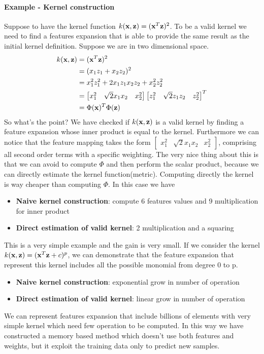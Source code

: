 \documentclass[main.tex]{subfiles}
\begin{document}
\paragraph{Example - Kernel construction}Suppose to have the kernel function $k(\textbf{x}, \textbf{z}) = (\textbf{x}^T \textbf{z})^2$.
To be a valid kernel we need to find a features expansion that is able to provide the same result as the initial kernel definition. Suppose we are in two dimensional space.
\begin{align*}
    k(\textbf{x},\textbf{z}) &= (\textbf{x}^T \textbf{z})^2 \\
    &= (x_1z_1 + x_2z_2)^2 \\
    &= x_1^2z_1^2 + 2x_1z_1x_2z_2 + x_2^2z_2^2 \\
    &= \begin{bmatrix} x_1^2 & \sqrt{2}x_1x_2 & x_2^2\end{bmatrix}\begin{bmatrix} z_1^2 & \sqrt{2}z_1z_2 & z_2^2\end{bmatrix}^T \\
    &= \Phi(\textbf{x})^T \Phi(\textbf{z})
\end{align*}
So what's the point? We have checked if $k(\textbf{x},\textbf{z})$ is a valid kernel by finding a feature expansion whose inner product is equal to the kernel. Furthermore we can notice that the feature mapping takes the form $\begin{bmatrix} x_1^2 & \sqrt{2}x_1x_2 & x_2^2\end{bmatrix}$, comprising all second order terms with a specific weighting. The very nice thing about this is that we can avoid to compute $\Phi$ and then perform the scalar product, because we can directly estimate the kernel function(metric). Computing directly the kernel is way cheaper than computing $\Phi$.
In this case we have
\begin{itemize}
    \item \textbf{Naive kernel construction}: compute 6 features values and 9 multiplication for inner product
    \item \textbf{Direct estimation of valid kernel}: 2 multiplication and a squaring
\end{itemize}
This is a very simple example and the gain is very small. If we consider the kernel $k(\textbf{x},\textbf{z}) = (\textbf{x}^T \textbf{z} + c)^p$, we can demonstrate that the feature expansion that represent this kernel includes all the possible monomial from degree 0 to p.
\begin{itemize}
    \item \textbf{Naive kernel construction}: exponential grow in number of operation
    \item \textbf{Direct estimation of valid kernel}: linear grow in number of operation
\end{itemize}
We can represent features expansion that include billions of elements with very simple kernel which need few operation to be computed.
In this way we have constructed a memory based method which doesn't use both features and weights, but it exploit the training data only to predict new samples.
\end{document}
